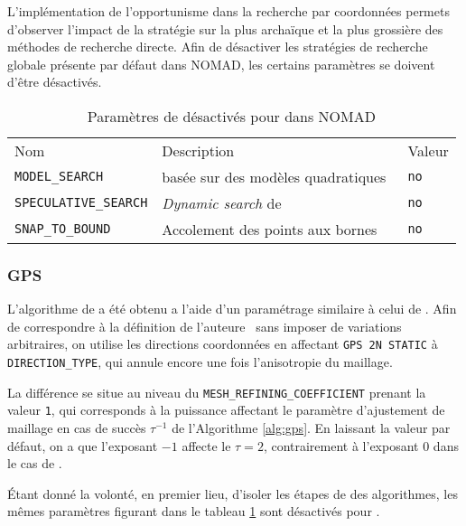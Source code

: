 L'implémentation de l'opportunisme dans la recherche par coordonnées permets d'observer l'impact de la stratégie sur  la plus archaïque et la plus grossière des méthodes de recherche directe. Afin de désactiver les stratégies de recherche globale présente par défaut dans NOMAD, les certains paramètres se doivent d'être désactivés.
\begin{table}[h]
	\centering
	\begin{tabular}{||l l l||}
		\hline
		Nom & Description & Valeur\\
		\hhline{||===||}
		\texttt{MODEL\_SEARCH} & \SEARCH basée sur des modèles quadratiques~\cite{CoLed2011}& \texttt{no}\\
		\texttt{SPECULATIVE\_SEARCH} & \emph{Dynamic search} de \cite{AuDe2006} & \texttt{no}\\
		\texttt{SNAP\_TO\_BOUND} & Accolement des points aux bornes & \texttt{no}\\
		\hline
	\end{tabular}
	\caption{Paramètres de \SEARCH désactivés pour \CS dans NOMAD}\label{tab:pdc}
\end{table}
\subsubsection{GPS}\label{sec:ngp}
L'algorithme de \GPS a été obtenu a l'aide d'un paramétrage similaire à celui de \CS. Afin de correspondre à la définition de l'auteure~\cite{Torc97a} sans imposer de variations arbitraires, on utilise les directions coordonnées en affectant \texttt{GPS 2N STATIC} à \texttt{DIRECTION\_TYPE}, qui annule encore une fois l'anisotropie du maillage.

La différence se situe au niveau du \texttt{MESH\_REFINING\_COEFFICIENT} prenant la valeur \texttt{1}, qui corresponds à la puissance affectant le paramètre d'ajustement de maillage en cas de succès $\tau^{-1}$ de l'Algorithme \ref{alg:gps}. En laissant la valeur par défaut, on a que l'exposant $-1$ affecte le $\tau = 2$, contrairement à l'exposant $0$ dans le cas de \CS.

Étant donné la volonté, en premier lieu, d'isoler les étapes de \POLL des algorithmes, les mêmes paramètres figurant dans le tableau \ref{tab:pdc} sont désactivés pour \GPS.
